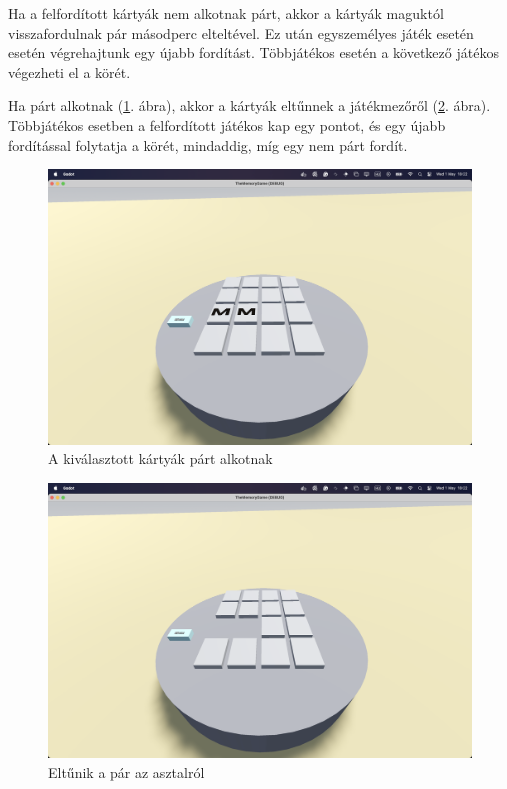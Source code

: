 Ha a felfordított kártyák nem alkotnak párt, akkor a kártyák maguktól visszafordulnak pár másodperc elteltével. Ez után egyszemélyes játék esetén esetén végrehajtunk egy újabb fordítást. Többjátékos esetén a következő játékos végezheti el a körét. 

Ha párt alkotnak (\ref{img:pair}. ábra), akkor a kártyák eltűnnek a játékmezőről  (\ref{img:pair_gone}. ábra). Többjátékos esetben a felfordított játékos kap egy pontot, és egy újabb fordítással folytatja a körét, mindaddig, míg egy nem párt fordít.
\begin{figure}
    \centering
    \includegraphics[width=\textwidth]{img/asztal_4x4_pair.png}
    \caption{A kiválasztott kártyák párt alkotnak}
    \label{img:pair}
\end{figure}
\begin{figure}
    \centering
    \includegraphics[width=\textwidth]{img/asztal_4x4_pair_eltunik.png}
    \caption{Eltűnik a pár az asztalról}
    \label{img:pair_gone}
\end{figure}
